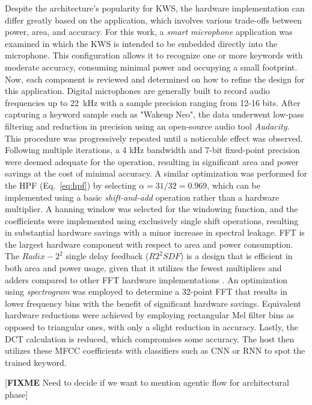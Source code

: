 Despite the architecture's popularity for KWS, the hardware implementation can differ greatly based on the application, which involves various trade-offs between power, area, and accuracy.
For this work, a \textit{smart microphone } application was examined in which the KWS is intended to be embedded directly into the microphone. This configuration allows it to recognize one or more keywords with moderate accuracy, consuming minimal power and occupying a small footprint.
Now, each component is reviewed and determined on how to refine the design for this application. Digital microphones are generally built to record audio frequencies up to 22~kHz with a sample precision ranging from 12-16 bits. After capturing a keyword sample such as "Wakeup Neo", the data underwent low-pass filtering and reduction in precision using an open-source audio tool \textit{Audacity}. This procedure was progressively repeated until a noticeable effect was observed. Following multiple iterations, a 4 kHz bandwidth and 7-bit fixed-point precision were deemed adequate for the operation, resulting in significant area and power savings at the cost of minimal accuracy.
A similar optimization was performed for the HPF (Eq.~\ref{eq:hpf}) by selecting $\alpha=31/32=0.969$, which can be implemented using a basic \textit{shift-and-add} operation rather than a hardware multiplier. 
A hanning window was selected for the windowing function, and the coefficients were implemented using exclusively single shift operations, resulting in substantial hardware savings with a minor increase in spectral leakage. 
FFT is the largest hardware component with respect to area and power consumption. The $Radix-2^2$ single delay feedback ($R2^2SDF$) is a design that is efficient in both area and power usage, given that it utilizes the fewest multipliers and adders compared to other FFT hardware implementations \cite{chong20220}. An optimization using \textit{spectrogram} was employed to determine a 32-point FFT that results in lower frequency bins with the benefit of significant hardware savings.
Equivalent hardware reductions were achieved by employing rectangular Mel filter bins as opposed to triangular ones, with only a slight reduction in accuracy. 
Lastly, the DCT calculation is reduced, which compromises some accuracy. The host then utilizes these MFCC coefficients with classifiers such as CNN or RNN to spot the trained keyword.

[\textbf{FIXME} Need to decide if we want to mention agentic flow for architectural phase]

